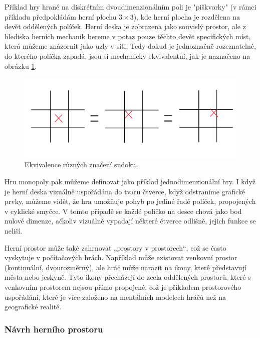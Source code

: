 Příklad hry hrané na diskrétním dvoudimenzionálním poli je "piškvorky" (v rámci příkladu předpokládám herní plochu $3\times3$), kde herní plocha je rozdělena na devět oddělených políček. Herní deska je zobrazena jako souvislý prostor, ale z hlediska herních mechanik bereme v potaz pouze těchto devět specifických míst, která můžeme znázornit jako uzly v síti. Tedy dokud je jednoznačně rozeznatelné, do kterého políčka zapadá, jsou si mechanicky ekvivalentní, jak je naznačeno na obrázku \ref{sudoku}.

\begin{figure}
  \centering      %
  \includegraphics[scale=0.3]{obr/sudoku.png} %
  \caption{Ekvivalence různých značení sudoku.} %
  \label{sudoku} %
\end{figure}

Hru monopoly pak můžeme definovat jako příklad jednodimenzionální hry. I když je herní deska vizuálně uspořádána do tvaru čtverce, když odstraníme grafické prvky, můžeme vidět, že hra umožňuje pohyb po jediné řadě políček, propojených v cyklické smyčce. V tomto případě se každé políčko na desce chová jako bod nulové dimenze, ačkoliv vizuálně vypadají některé čtverce odlišně, jejich funkce se neliší.

Herní prostor může také zahrnovat „prostory v prostorech“, což se často vyskytuje v počítačových hrách. Například může existovat venkovní prostor (kontinuální, dvourozměrný), ale hráč může narazit na ikony, které představují města nebo jeskyně. Tyto ikony přecházejí do zcela oddělených prostorů, které s venkovním prostorem nejsou přímo propojené, což je příkladem prostorového uspořádání, které je více založeno na mentálních modelech hráčů než na geografické realitě.

\subsubsection{Návrh herního prostoru}

